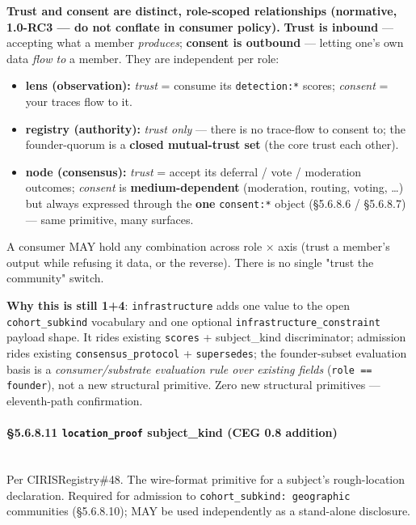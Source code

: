 \documentclass[11pt]{article}
\begin{document}
\textbf{Trust and consent are distinct, role-scoped relationships (normative, 1.0-RC3 — do not conflate in consumer policy).} \textbf{Trust is inbound} — accepting what a member \textit{produces}; \textbf{consent is outbound} — letting one's own data \textit{flow to} a member. They are independent per role:

\begin{itemize}\setlength\itemsep{0pt}
\item \textbf{lens (observation):} \textit{trust} = consume its \texttt{detection:*} scores; \textit{consent} = your traces flow to it.
\item \textbf{registry (authority):} \textit{trust only} — there is no trace-flow to consent to; the founder-quorum is a \textbf{closed mutual-trust set} (the core trust each other).
\item \textbf{node (consensus):} \textit{trust} = accept its deferral / vote / moderation outcomes; \textit{consent} is \textbf{medium-dependent} (moderation, routing, voting, …) but always expressed through the \textbf{one} \texttt{consent:*} object (§5.6.8.6 / §5.6.8.7) — same primitive, many surfaces.
\end{itemize}


A consumer MAY hold any combination across role × axis (trust a member's output while refusing it data, or the reverse). There is no single "trust the community" switch.


\textbf{Why this is still 1+4}: \texttt{infrastructure} adds one value to the open \texttt{cohort\_subkind} vocabulary and one optional \texttt{infrastructure\_constraint} payload shape. It rides existing \texttt{scores} + subject\_kind discriminator; admission rides existing \texttt{consensus\_protocol} + \texttt{supersedes}; the founder-subset evaluation basis is a \textit{consumer/substrate evaluation rule over existing fields} (\texttt{role == founder}), not a new structural primitive. Zero new structural primitives — eleventh-path confirmation.


\paragraph{§5.6.8.11 \texttt{location\_proof} subject\_kind (CEG 0.8 addition)}\mbox{}\\


Per CIRISRegistry\#48. The wire-format primitive for a subject's rough-location declaration. Required for admission to \texttt{cohort\_subkind: geographic} communities (§5.6.8.10); MAY be used independently as a stand-alone disclosure.
\end{document}

